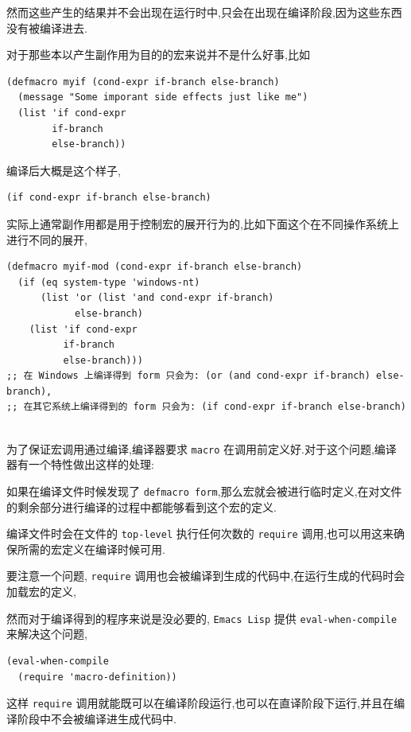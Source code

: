 \documentclass[11pt]{article}
\begin{document}
然而这些产生的结果并不会出现在运行时中,只会在出现在编译阶段,因为这些东西没有被编译进去.

对于那些本以产生副作用为目的的宏来说并不是什么好事,比如

\begin{verbatim}
(defmacro myif (cond-expr if-branch else-branch)
  (message "Some imporant side effects just like me")
  (list 'if cond-expr
        if-branch
        else-branch))
\end{verbatim}

编译后大概是这个样子,

\begin{verbatim}
(if cond-expr if-branch else-branch)
\end{verbatim}

实际上通常副作用都是用于控制宏的展开行为的,比如下面这个在不同操作系统上进行不同的展开,

\begin{verbatim}
(defmacro myif-mod (cond-expr if-branch else-branch)
  (if (eq system-type 'windows-nt)
      (list 'or (list 'and cond-expr if-branch)
            else-branch)
    (list 'if cond-expr
          if-branch
          else-branch)))
;; 在 Windows 上编译得到 form 只会为: (or (and cond-expr if-branch) else-branch),
;; 在其它系统上编译得到的 form 只会为: (if cond-expr if-branch else-branch)
\end{verbatim}

\\[0pt]

为了保证宏调用通过编译,编译器要求 \texttt{macro} 在调用前定义好.对于这个问题,编译器有一个特性做出这样的处理:

如果在编译文件时候发现了 \texttt{defmacro form},那么宏就会被进行临时定义,在对文件的剩余部分进行编译的过程中都能够看到这个宏的定义.

编译文件时会在文件的 \texttt{top-level} 执行任何次数的 \texttt{require} 调用,也可以用这来确保所需的宏定义在编译时候可用.

要注意一个问题, \texttt{require} 调用也会被编译到生成的代码中,在运行生成的代码时会加载宏的定义,

然而对于编译得到的程序来说是没必要的, \texttt{Emacs Lisp} 提供 \texttt{eval-when-compile} 来解决这个问题,

\begin{verbatim}
(eval-when-compile
  (require 'macro-definition))
\end{verbatim}

这样 \texttt{require} 调用就能既可以在编译阶段运行,也可以在直译阶段下运行,并且在编译阶段中不会被编译进生成代码中.
\end{document}
